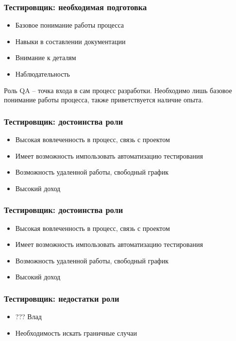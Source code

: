 \documentclass{../industrial-development}
\begin{document}
\begin{frame} \frametitle{Тестировщик: необходимая подготовка}
	\begin{itemize}
		\item Базовое понимание работы процесса
		\item Навыки в составлении документации
		\item Внимание к деталям
		\item Наблюдательность 
	\end{itemize}
	\begin{block}{}
		\alert {}Роль QA – точка входа в сам процесс разработки. Необходимо лишь базовое понимание работы процесса, также приветствуется наличие опыта. 
	\end{block}
	
\end{frame}

\begin{frame} \frametitle{Тестировщик: достоинства роли}
	\begin{itemize}
		\item Высокая вовлеченность в процесс, связь с проектом
		\item Имеет возможность импользовать автоматизацию тестирования
		\item Возможность удаленной работы, свободный график
		\item Высокий доход
	\end{itemize}
\end{frame}

\begin{frame} \frametitle{Тестировщик: достоинства роли}
	\begin{itemize}
		\item Высокая вовлеченность в процесс, связь с проектом
		\item Имеет возможность импользовать автоматизацию тестирования
		\item Возможность удаленной работы, свободный график
		\item Высокий доход
	\end{itemize}
\end{frame}

\begin{frame} \frametitle{Тестировщик: недостатки роли}
	\begin{itemize}
		\item ??? Влад
		\item Необходимость искать граничные случаи
	\end{itemize}
\end{frame}
\end{document}
